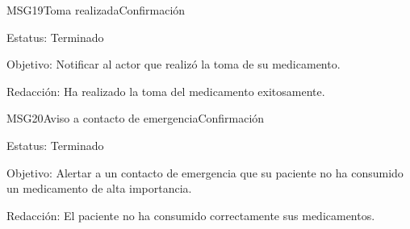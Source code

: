 \begin{mensaje}{MSG19}{Toma realizada}{Confirmación}
	\item[Estatus:] Terminado
	\item[Objetivo:] Notificar al actor que realizó la toma de su medicamento.
	\item[Redacción:] Ha realizado la toma del medicamento exitosamente.
\end{mensaje}

\begin{mensaje}{MSG20}{Aviso a contacto de emergencia}{Confirmación}
	\item[Estatus:] Terminado
	\item[Objetivo:] Alertar a un contacto de emergencia que su paciente no ha consumido un medicamento de alta importancia.
	\item[Redacción:] El paciente no ha consumido correctamente sus medicamentos.
\end{mensaje}

